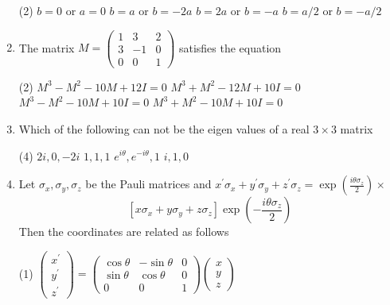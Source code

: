 \begin{enumerate}[label=\color{ocre}\textbf{\arabic*.}]
	\begin{tasks}(2)
		\task[\textbf{A.}] $b=0$ or $a=0$
		\task[\textbf{B.}] $b=a$ or $b=-2 a$
		\task[\textbf{C.}] $b=2 a$ or $b=-a$
		\task[\textbf{D.}] $b=a / 2$ or $b=-a / 2$
	\end{tasks}
	\item The matrix $M=\left(\begin{array}{ccc}1 & 3 & 2 \\ 3 & -1 & 0 \\ 0 & 0 & 1\end{array}\right)$ satisfies the equation
	{}
	\begin{tasks}(2)
		\task[\textbf{A.}] $M^{3}-M^{2}-10 M+12 I=0$
		\task[\textbf{B.}] $M^{3}+M^{2}-12 M+10 I=0$
		\task[\textbf{C.}] $M^{3}-M^{2}-10 M+10 I=0$
		\task[\textbf{D.}] $M^{3}+M^{2}-10 M+10 I=0$
	\end{tasks}
	\item   Which of the following can not be the eigen values of a real $3 \times 3$ matrix
	{}
	\begin{tasks}(4)
		\task[\textbf{A.}]  $2 i, 0,-2 i$
		\task[\textbf{B.}] $1,1,1$
		\task[\textbf{C.}] $e^{i \theta}, e^{-i \theta}, 1$
		\task[\textbf{D.}] $i, 1,0$
	\end{tasks}
	\item  Let $\sigma_{x}, \sigma_{y}, \sigma_{z}$ be the Pauli matrices and $x^{\prime} \sigma_{x}+y^{\prime} \sigma_{y}+z^{\prime} \sigma_{z}=\exp \left(\frac{i \theta \sigma_{z}}{2}\right) \times$
	$$
	\left[x \sigma_{x}+y \sigma_{y}+z \sigma_{z}\right] \exp \left(-\frac{i \theta \sigma_{z}}{2}\right)
	$$
	Then the coordinates are related as follows
	{}
	\begin{tasks}(1)
		\task[\textbf{A.}] $\left(\begin{array}{l}x^{\prime} \\ y^{\prime} \\ z^{\prime}\end{array}\right)=\left(\begin{array}{ccc}\cos \theta & -\sin \theta & 0 \\ \sin \theta & \cos \theta & 0 \\ 0 & 0 & 1\end{array}\right)\left(\begin{array}{l}x \\ y \\ z\end{array}\right)$

\end{tasks}
\end{enumerate}
